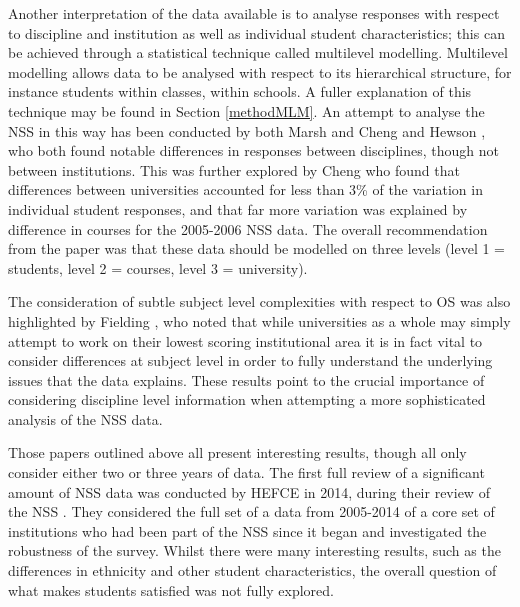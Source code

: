 \documentclass[11pt,a4paper]{report}
\begin{document}
Another interpretation of the data available is to analyse responses with respect to discipline and institution as well as individual student characteristics; this can be achieved through a statistical technique called multilevel modelling. Multilevel modelling allows data to be analysed with respect to its hierarchical structure, for instance students within classes, within schools. A fuller explanation of this technique may be found in Section \ref{methodMLM}. An attempt to analyse the NSS in this way has been conducted by both Marsh and Cheng \cite{marshandcheng2008} and Hewson \cite{hewson2011preliminary}, who both found notable differences in responses between disciplines, though not between institutions. This was further explored by Cheng \cite{cheng2010unicoursediffs} who found that differences between universities accounted for less than 3\% of the variation in individual student responses, and that far more variation was explained by difference in courses for the 2005-2006 NSS data. The overall recommendation from the paper was that these data should be modelled on three levels (level 1 = students, level 2 = courses, level 3 = university).

The consideration of subtle subject level complexities with respect to OS was also highlighted by Fielding \cite{fielding2010sciencesubjects}, who noted that while universities as a whole may simply attempt to work on their lowest scoring institutional area it is in fact vital to consider differences at subject level in order to fully understand the underlying issues that the data explains. These results point to the crucial importance of considering discipline level information when attempting a more sophisticated analysis of the \ac{NSS} data.

Those papers outlined above all present interesting results, though all only consider either two or three years of data. The first full review of a significant amount of \ac{NSS} data was conducted by \ac{HEFCE} in 2014, during their review of the \ac{NSS} \cite{HEFCEreport2014}. They considered the full set of a data from 2005-2014 of a core set of institutions who had been part of the NSS since it began and investigated the robustness of the survey. Whilst there were many interesting results, such as the differences in ethnicity and other student characteristics, the overall question of what makes students satisfied was not fully explored. 
\end{document}
